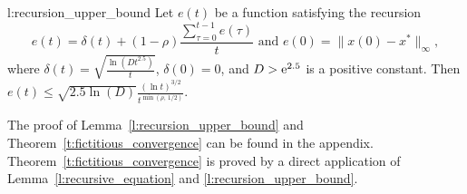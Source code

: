 \begin{replemma}{l:recursion_upper_bound}
  Let $e(t)$ be a function satisfying the recursion
  \[
    e(t) =
    \delta(t) + (1-\rho)\frac{\sum_{\tau=0}^{t-1}e(\tau)}{t}
    \text{ and } e(0)=\|x(0) - x^*\|_{\infty},
  \]
  where \(\delta(t) = \sqrt{\frac{\ln(D t^{2.5})}{t}} \), \(\delta(0) = 0 \),
  and $D > \mathrm{e}^{2.5}$ is a positive constant.  Then
  \(
    e(t) \leq
    \sqrt{2.5 \ln(D)} \frac{(\ln t)^{3/2}}{t^{\min(\rho,\, 1/2)}}.
  \)
\end{replemma}
\noindent The proof of Lemma~\ref{l:recursion_upper_bound}
and Theorem~\ref{t:fictitious_convergence}
can be found in the appendix. Theorem~\ref{t:fictitious_convergence} 
is proved by a direct application of Lemma~\ref{l:recursive_equation}
and \ref{l:recursion_upper_bound}.
